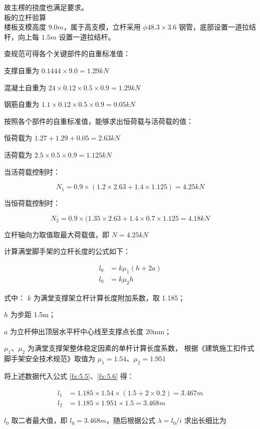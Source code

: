 故主楞的挠度也满足要求。\\

 板的立杆验算\\

楼板支模高度 $9.0m$，属于高支模，立杆采用 $\phi 48.3\times 3.6$ 钢管，底部设置一道拉结杆，向上每 $1.5m$ 设置一道拉结杆。

查规范可得各个关键部件的自重标准值：

支撑自重为 $0.1444\times 9.0=1.29kN$

混凝土自重为 $24\times 0.12\times 0.5\times 0.9=1.29kN $

钢筋自重为 $1.1\times 0.12\times 0.5\times 0.9=0.05kN$

按照各个部件的自重标准值，能够求出恒荷载与活荷载的值：

恒荷载为 $1.27+1.29+0.05=2.63kN$

活荷载为 $2.5\times 0.5\times 0.9=1.125kN$

当活荷载控制时：

\[N_1=0.9\times (1.2\times 2.63+1.4\times 1.125)=4.25kN\]

当恒荷载控制时：

\[N_2=0.9\times (1.35\times 2.63+1.4\times 0.7\times 1.125=4.18kN\]

立杆轴向力取值取最大荷载值，即 $N=4.25 kN$

计算满堂脚手架的立杆长度的公式如下：

\begin{align}
\label{fx:5.5}
l_0&=k\mu_1(h+2a)\\
\label{fx:5.6}
l_0&=k\mu_2h
\end{align}

式中：
$k$ 为满堂支撑架立杆计算长度附加系数，取 1.185；   

$h$ 为步距 1.5m；                           

$a$ 为立杆伸出顶层水平杆中心线至支撑点长度 20mm；

$\mu_1$、$\mu_2$ 为满堂支撑架整体稳定因素的单杆计算长度系数，
根据《建筑施工扣件式脚手架安全技术规范》取值为 $\mu_1=1.54$、$\mu_2=1.951$

将上述数据代入公式 \ref{fx:5.5}、\ref{fx:5.6} 得：

\begin{align*}
    l_1&=1.185\times 1.54\times (1.5+2\times 0.2)=3.467 m\\
    l_2&=1.185\times 1.951\times 1.5=3.468 m
\end{align*}

$l_0$ 取二者最大值，即 $l_0=3.468 m$，随后根据公式 $\lambda=l_0/i$ 求出长细比为

